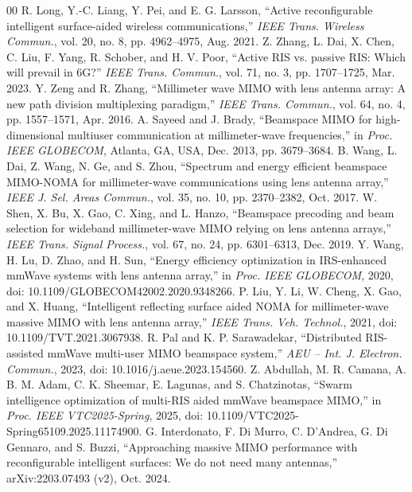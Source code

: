 \documentclass{ieeeaccess}
\begin{document}
\begin{thebibliography}{00}
 R. Long, Y.-C. Liang, Y. Pei, and E. G. Larsson, ``Active reconfigurable intelligent surface-aided wireless communications,'' \emph{IEEE Trans. Wireless Commun.}, vol. 20, no. 8, pp. 4962--4975, Aug. 2021.
 Z. Zhang, L. Dai, X. Chen, C. Liu, F. Yang, R. Schober, and H. V. Poor, ``Active RIS vs. passive RIS: Which will prevail in 6G?'' \emph{IEEE Trans. Commun.}, vol. 71, no. 3, pp. 1707--1725, Mar. 2023.
 Y. Zeng and R. Zhang, ``Millimeter wave MIMO with lens antenna array: A new path division multiplexing paradigm,'' \emph{IEEE Trans. Commun.}, vol. 64, no. 4, pp. 1557--1571, Apr. 2016.
 A. Sayeed and J. Brady, ``Beamspace MIMO for high-dimensional multiuser communication at millimeter-wave frequencies,'' in \emph{Proc. IEEE GLOBECOM}, Atlanta, GA, USA, Dec. 2013, pp. 3679--3684.
 B. Wang, L. Dai, Z. Wang, N. Ge, and S. Zhou, ``Spectrum and energy efficient beamspace MIMO-NOMA for millimeter-wave communications using lens antenna array,'' \emph{IEEE J. Sel. Areas Commun.}, vol. 35, no. 10, pp. 2370--2382, Oct. 2017.
 W. Shen, X. Bu, X. Gao, C. Xing, and L. Hanzo, ``Beamspace precoding and beam selection for wideband millimeter-wave MIMO relying on lens antenna arrays,'' \emph{IEEE Trans. Signal Process.}, vol. 67, no. 24, pp. 6301--6313, Dec. 2019.
 Y. Wang, H. Lu, D. Zhao, and H. Sun, ``Energy efficiency optimization in IRS-enhanced mmWave systems with lens antenna array,'' in \emph{Proc. IEEE GLOBECOM}, 2020, doi: 10.1109/GLOBECOM42002.2020.9348266.
 P. Liu, Y. Li, W. Cheng, X. Gao, and X. Huang, ``Intelligent reflecting surface aided NOMA for millimeter-wave massive MIMO with lens antenna array,'' \emph{IEEE Trans. Veh. Technol.}, 2021, doi: 10.1109/TVT.2021.3067938.
 R. Pal and K. P. Sarawadekar, ``Distributed RIS-assisted mmWave multi-user MIMO beamspace system,'' \emph{AEU -- Int. J. Electron. Commun.}, 2023, doi: 10.1016/j.aeue.2023.154560.
 Z. Abdullah, M. R. Camana, A. B. M. Adam, C. K. Sheemar, E. Lagunas, and S. Chatzinotas, ``Swarm intelligence optimization of multi-RIS aided mmWave beamspace MIMO,'' in \emph{Proc. IEEE VTC2025-Spring}, 2025, doi: 10.1109/VTC2025-Spring65109.2025.11174900.
 G. Interdonato, F. Di Murro, C. D'Andrea, G. Di Gennaro, and S. Buzzi, ``Approaching massive MIMO performance with reconfigurable intelligent surfaces: We do not need many antennas,'' arXiv:2203.07493 (v2), Oct. 2024.

\end{thebibliography}
\end{document}
